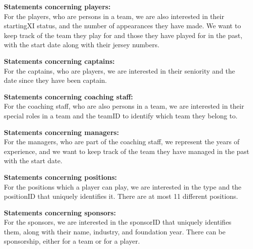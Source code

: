 \documentclass{article}[h]
\begin{document}
    \vspace{12px}
    \textbf{Statements concerning players:\\}
    For the players, who are persons in a team, we are also interested in their startingXI status, and the number of appearances they have made.
    We want to keep track of the team they play for and those they have played for in the past, with the start date along with their jersey numbers.

    \vspace{12px}
    \textbf{Statements concerning captains:\\}
    For the captains, who are players, we are interested in their seniority and the date since they have been captain.

    \vspace{12px}
    \textbf{Statements concerning coaching staff:\\}
    For the coaching staff, who are also persons in a team, we are interested in their special roles in a team and the teamID to identify which team they belong to.

    \vspace{12px}
    \textbf{Statements concerning managers:\\}
    For the managers, who are part of the coaching staff, we represent the years of experience, and we want to keep track of the team they have managed in the past with the start date.

    \vspace{12px}
    \textbf{Statements concerning positions:\\}
    For the positions which a player can play, we are interested in the type and the positionID that uniquely identifies it.
    There are at most 11 different positions.

    \vspace{12px}
    \textbf{Statements concerning sponsors:\\}
    For the sponsors, we are interested in the sponsorID that uniquely identifies them, along with their name, industry, and foundation year.
    There can be sponsorship, either for a team or for a player.

    \pagebreak
\end{document}
